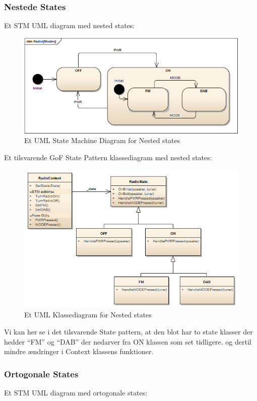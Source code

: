 \subsubsection{Nestede States}

Et STM UML diagram med nested states:

\begin{figure}[H]
	\centering
	\includegraphics[width=0.7\linewidth]{figs/state/Radio[Modes]_STM}
	\caption{Et UML State Machine Diagram for Nested states}
	\label{fig:UMLNestedState}
\end{figure}

Et tilsvarende GoF State Pattern klassediagram med nested states:

\begin{figure}[H]
	\centering
	\includegraphics[width=0.7\linewidth]{figs/state/RadioNeted_SP}
	\caption{Et UML Klassediagram for Nested states}
	\label{fig:UMLClassNestedState}
\end{figure}

Vi kan her se i det tilsvarende State pattern, at den blot har to state klasser der hedder “FM” og “DAB” der nedarver fra ON klassen som set tidligere. og dertil mindre ændringer i Context klassens funktioner. 

\subsubsection{Ortogonale States}

Et STM UML diagram med ortogonale states:

